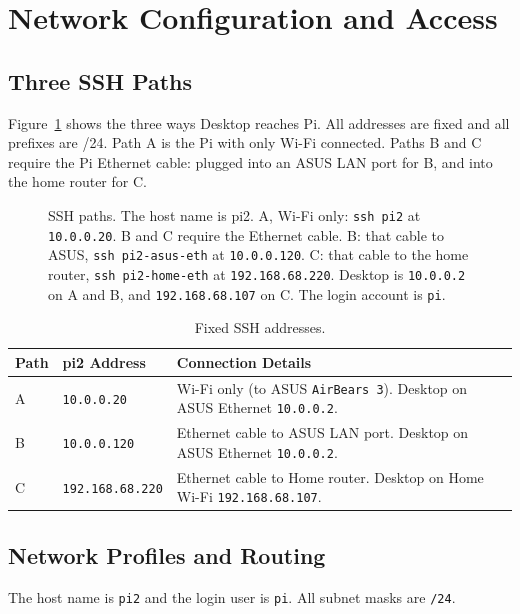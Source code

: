 \clearpage
\section{Network Configuration and Access}
\label{sec:network}
\subsection{Three SSH Paths}
Figure~\ref{fig:laptop-robot-lan} shows the three ways Desktop reaches Pi. All addresses are fixed and all prefixes are /24. Path A is the Pi with only Wi-Fi connected. Paths B and C require the Pi Ethernet cable: plugged into an ASUS LAN port for B, and into the home router for C.

\begin{figure}[H]
\centering

\caption{SSH paths. The host name is pi2. A, Wi-Fi only: \texttt{ssh pi2} at \texttt{10.0.0.20}. B and C require the Ethernet cable. B: that cable to ASUS, \texttt{ssh pi2-asus-eth} at \texttt{10.0.0.120}. C: that cable to the home router, \texttt{ssh pi2-home-eth} at \texttt{192.168.68.220}. Desktop is \texttt{10.0.0.2} on A and B, and \texttt{192.168.68.107} on C. The login account is \texttt{pi}.}
\label{fig:laptop-robot-lan}
\end{figure}

\begin{table}[H]
\centering\small
\caption{Fixed SSH addresses.}
\label{tab:current-network}
\begin{tabular}{@{}lll@{}}
\toprule
Path & pi2 Address & Connection Details \\
\midrule
A & \texttt{10.0.0.20} & Wi-Fi only (to ASUS \texttt{AirBears 3}). Desktop on ASUS Ethernet \texttt{10.0.0.2}. \\
B & \texttt{10.0.0.120} & Ethernet cable to ASUS LAN port. Desktop on ASUS Ethernet \texttt{10.0.0.2}. \\
C & \texttt{192.168.68.220} & Ethernet cable to Home router. Desktop on Home Wi-Fi \texttt{192.168.68.107}. \\
\bottomrule
\end{tabular}
\end{table}

\subsection{Network Profiles and Routing}
The host name is \texttt{pi2} and the login user is \texttt{pi}. All subnet masks are \texttt{/24}.

